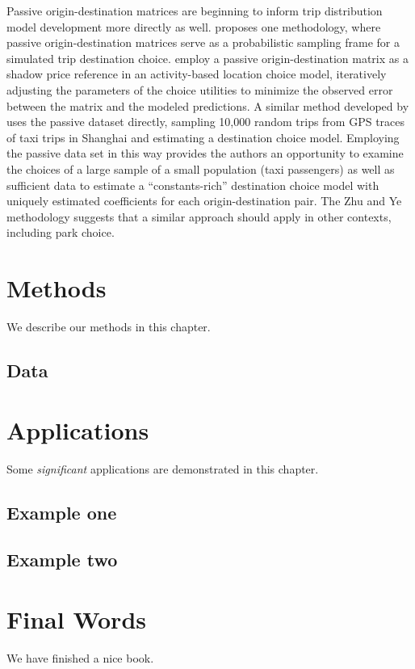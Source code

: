 \documentclass[]{elsarticle} %
\begin{document}
Passive origin-destination matrices are beginning to inform trip distribution
model development more directly as well. \citet{tf_idea} proposes one methodology,
where passive origin-destination matrices serve as a probabilistic sampling
frame for a simulated trip destination choice. \citet{Bernardin2018} employ a passive
origin-destination matrix as a shadow price reference in an activity-based
location choice model, iteratively adjusting the parameters of the choice
utilities to minimize the observed error between the matrix and the modeled
predictions. A similar method developed by \citet{Zhu2018} uses the passive dataset
directly, sampling 10,000 random trips from GPS traces of taxi trips in Shanghai
and estimating a destination choice model. Employing the passive data set in
this way provides the authors an opportunity to examine the choices of a
large sample of a small population (taxi passengers) as well as sufficient data
to estimate a ``constants-rich'' destination choice model with uniquely estimated
coefficients for each origin-destination pair. The Zhu and Ye methodology
suggests that a similar approach should apply in other contexts, including park
choice.

\hypertarget{methods}{%
\section{Methods}\label{methods}}

We describe our methods in this chapter.

\hypertarget{data}{%
\subsection{Data}\label{data}}

\hypertarget{applications}{%
\section{Applications}\label{applications}}

Some \emph{significant} applications are demonstrated in this chapter.

\hypertarget{example-one}{%
\subsection{Example one}\label{example-one}}

\hypertarget{example-two}{%
\subsection{Example two}\label{example-two}}

\hypertarget{final-words}{%
\section{Final Words}\label{final-words}}

We have finished a nice book.


\end{document}
